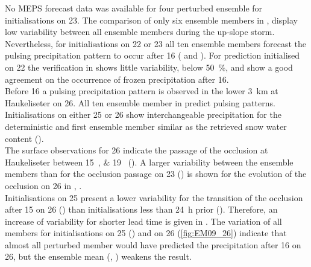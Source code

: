 No MEPS forecast data was available for four perturbed ensemble for initialisations on \SI{23}{\dec}.
The comparison of only six ensemble members %
in , display low variability between all ensemble members during the up-slope storm. %
Nevertheless, for initialisations on \num{22} or \SI{23}{\dec} all ten ensemble members forecast the pulsing precipitation pattern to occur after \SI{16}{\UTC} ( and ). 
For prediction initialised on \SI{22}{\dec} the verification in  shows little variability, below \SI{50}{\percent}, and show a good agreement on the occurrence of frozen precipitation after \SI{16}{\UTC}. 
\\
Before \SI{16}{\UTC} a pulsing precipitation pattern is observed in the lower \SI{3}{\km} at Haukeliseter on \SI{26}{\dec}. All ten ensemble member in  predict pulsing patterns. Initialisations on either \num{25} or \SI{26}{\dec} show interchangeable precipitation for the deterministic and first ensemble member similar as the retrieved snow water content (). 
\\
The surface observations for \SI{26}{\dec} indicate the passage of the occlusion at Haukeliseter between \SIlist{15;19}{\UTC} (). A larger variability between the ensemble members than for the occlusion passage on \SI{23}{\dec} ()  is shown for the evolution of the occlusion on \SI{26}{\dec} in , .  
\\
Initialisations on \SI{25}{\dec} present a lower variability for the transition of the occlusion after \SI{15}{\UTC} on \SI{26}{\dec}  () than initialisations less than \SI{24}{\hour} prior (). 
Therefore, an increase of variability for shorter lead time is given in . %
The variation of all members for initialisations on \SI{25}{\dec} () and on \SI{26}{\dec} (\ref{fig:EM09_26}) indicate that almost all perturbed member would have predicted the precipitation after \SI{16}{\UTC} on \SI{26}{\dec}, but the ensemble mean (, ) weakens the result. 
